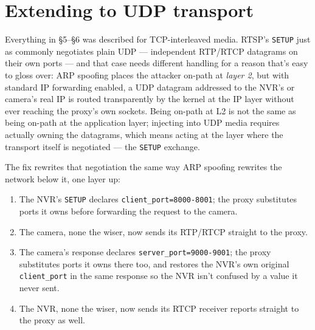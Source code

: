 \documentclass[11pt,a4paper]{article}
\newcommand{\code}[1]{\texttt{\small #1}}
\begin{document}
\section{Extending to UDP transport}
Everything in \S5--\S6 was described for TCP-interleaved media. RTSP's \code{SETUP} just as commonly negotiates plain UDP --- independent RTP/RTCP datagrams on their own ports --- and that case needs different handling for a reason that's easy to gloss over: ARP spoofing places the attacker on-path at \emph{layer 2}, but with standard IP forwarding enabled, a UDP datagram addressed to the NVR's or camera's real IP is routed transparently by the kernel at the IP layer without ever reaching the proxy's own sockets. Being on-path at L2 is not the same as being on-path at the application layer; injecting into UDP media requires actually owning the datagrams, which means acting at the layer where the transport itself is negotiated --- the \code{SETUP} exchange.

The fix rewrites that negotiation the same way ARP spoofing rewrites the network below it, one layer up:
\begin{enumerate}[leftmargin=1.4em, itemsep=2pt]
\item The NVR's \code{SETUP} declares \code{client\_port=8000-8001}; the proxy substitutes ports it owns before forwarding the request to the camera.
\item The camera, none the wiser, now sends its RTP/RTCP straight to the proxy.
\item The camera's response declares \code{server\_port=9000-9001}; the proxy substitutes ports it owns there too, and restores the NVR's own original \code{client\_port} in the same response so the NVR isn't confused by a value it never sent.
\item The NVR, none the wiser, now sends its RTCP receiver reports straight to the proxy as well.
\end{enumerate}
\end{document}
